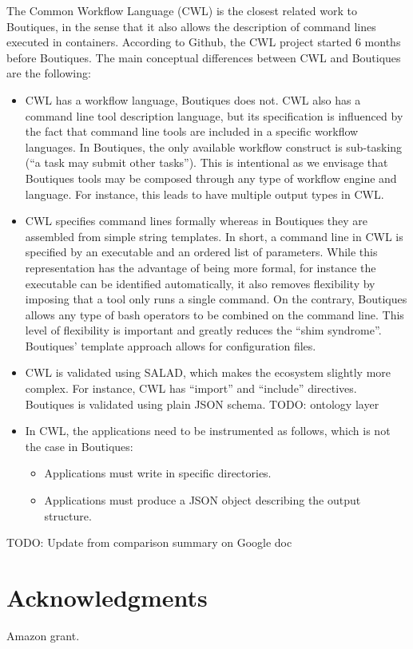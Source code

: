 \documentclass{article}
\newcommand{\todo}[2]{\color{red}TODO: #1\color{black}}
\begin{document}
The Common Workflow Language (CWL) is the closest related work to
Boutiques, in the sense that it also allows the description of command
lines executed in containers. According to Github, the CWL project
started 6 months before Boutiques. The main conceptual differences
between CWL and Boutiques are the following:
\begin{itemize}
\item CWL has a workflow language, Boutiques does not. CWL also has a
  command line tool description language, but its specification is
  influenced by the fact that command line tools are included in a
  specific workflow languages. In Boutiques, the only available
  workflow construct is sub-tasking (``a task may submit other
  tasks''). This is intentional as we envisage that Boutiques tools
  may be composed through any type of workflow engine and language. For instance, this leads to have multiple output types in CWL.
\item CWL specifies command lines formally whereas in Boutiques they
  are assembled from simple string templates. In short, a command line
  in CWL is specified by an executable and an ordered list of
  parameters. While this representation has the advantage of being
  more formal, for instance the executable can be identified
  automatically, it also removes flexibility by imposing that a tool
  only runs a single command. On the contrary, Boutiques allows any
  type of bash operators to be combined on the command line. This
  level of flexibility is important and greatly reduces the ``shim
  syndrome''. Boutiques' template approach allows for configuration files. 
\item CWL is validated using SALAD, which makes the ecosystem slightly
  more complex. For instance, CWL has ``import'' and ``include''
  directives. Boutiques is validated using plain JSON schema. \todo{ontology layer}.
\item In CWL, the applications need to be instrumented as follows, which is not the case in Boutiques:
\begin{itemize}
\item Applications must write in specific directories.
\item Applications must produce a JSON object describing the output structure.
\end{itemize}
\end{itemize}

\todo{Update from comparison summary on Google doc}


\section{Conclusion}

\section{Acknowledgments}

Amazon grant.



\end{document}
